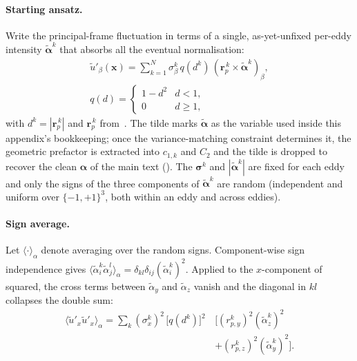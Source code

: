 \documentclass[
 amsmath,amssymb,
 aps,
 twocolumn,
]{revtex4-2}
\renewcommand{\vec}[1]{\boldsymbol{#1}}
\begin{document}
\paragraph*{Starting ansatz.}
Write the principal-frame fluctuation in terms of a single, as-yet-unfixed
per-eddy intensity $\tilde{\vec\alpha}^k$ that absorbs all the eventual
normalisation:
\begin{equation}\label{eq:app_ansatz}
\begin{gathered}
  \tilde u'_\beta(\vec x) = \sum_{k=1}^N
    \sigma_{\beta}^k\, q(d^k)\,
    (\vec r_p^{\,k}\times\tilde{\vec\alpha}^k)_\beta, \\
  q(d) =
    \begin{cases}1-d^2 & d<1,\\ 0 & d\ge 1,\end{cases}
\end{gathered}
\end{equation}
with $d^k=|\vec r_p^{\,k}|$ and $\vec r_p^{\,k}$ from~. The
tilde marks $\tilde{\vec\alpha}$ as the variable used inside this
appendix's bookkeeping; once the variance-matching constraint determines
it, the geometric prefactor is extracted into $c_{1,k}$ and $C_2$ and the
tilde is dropped to recover the clean $\vec\alpha$ of the main text
(). The $\vec\sigma^k$ and $|\tilde{\vec\alpha}^k|$ are
fixed for each eddy and only the signs of the three components of
$\tilde{\vec\alpha}^k$ are random (independent and uniform over
$\{-1,+1\}^3$, both within an eddy and across eddies).

\paragraph*{Sign average.}
Let $\langle\cdot\rangle_\alpha$ denote averaging over the random signs.
Component-wise sign independence gives
$\langle\tilde\alpha_i^k\tilde\alpha_j^l\rangle_\alpha
   = \delta_{kl}\delta_{ij}(\tilde\alpha_i^k)^2$.
Applied to the $x$-component of~ squared, the cross
terms between $\tilde\alpha_y$ and $\tilde\alpha_z$ vanish and the
diagonal in $kl$ collapses the double sum:
\begin{equation}\label{eq:app_after_sign}
\begin{aligned}
  \langle\tilde u'_x\tilde u'_x\rangle_\alpha
  = \sum_k (\sigma_x^k)^2\,\bigl[q(d^k)\bigr]^2\,&\bigl[(r_{p,y}^k)^2(\tilde\alpha_z^k)^2 \\[-0.4em]
  & + (r_{p,z}^k)^2(\tilde\alpha_y^k)^2\bigr].
\end{aligned}
\end{equation}
\end{document}
